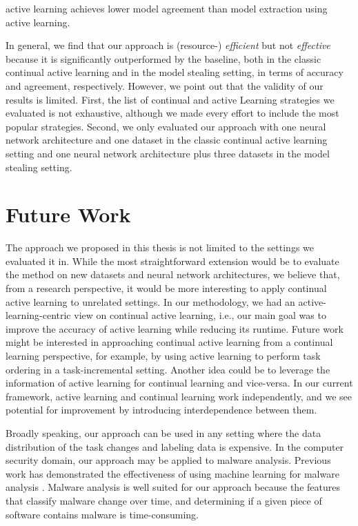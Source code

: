 active learning achieves lower model agreement than model extraction using active learning. \par
In general, we find that our approach is (resource-) \textit{efficient} but not \textit{effective} because it is significantly outperformed
by the baseline, both in the classic continual active learning and in the model stealing setting, in terms of accuracy and agreement,
respectively. However, we point out that the validity of our results is limited. First, the list of continual and active Learning
strategies we evaluated is not exhaustive, although we made every effort to include the most popular strategies. Second, we only evaluated our
approach with one neural network architecture and one dataset in the classic continual active learning setting and one neural network architecture
plus three datasets in the model stealing setting.
\section{Future Work}
\label{sec:Conclusion:FutureWork}
The approach we proposed in this thesis is not limited to the settings we evaluated it in. While the most straightforward extension would
be to evaluate the method on new datasets and neural network architectures, we believe that, from a research
perspective, it would be more interesting to apply continual active learning to unrelated settings. In our methodology, we had an active-learning-centric view on continual active learning, i.e., our main goal was to improve the accuracy of active learning while reducing its runtime. Future
work might be interested in approaching continual active learning from a continual learning perspective, for example, by using active learning to
perform task ordering in a task-incremental setting. Another idea could be to leverage the information of active learning for continual learning
and vice-versa. In our current framework, active learning and continual learning work independently, and we see potential for improvement by 
introducing interdependence between them. \par
Broadly speaking, our approach can be used in any setting where the data distribution of the task changes and labeling data is expensive.
In the computer security domain, our approach may be applied to malware analysis. Previous work has demonstrated the effectiveness of using
machine learning for malware analysis \parencite{nath2014static,ijaz2019static}. Malware analysis is well suited for our approach
because the features that classify malware change over time, and determining if a given piece of software contains malware is time-consuming.